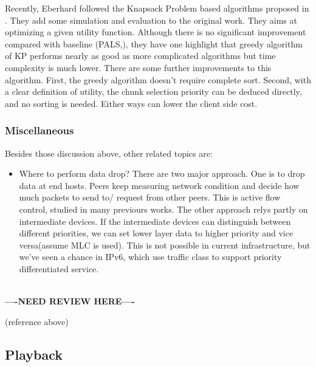 \documentclass[11pt,a4paper]{article}
\newcommand{\question}{\textbf{\\----NEED REVIEW HERE----\\}}
\begin{document}
Recently, Eberhard \cite{eberhard2010knapsack} followed the 
Knapsack Problem based algorithms proposed in \cite{szkaliczki2010piece}. 
They add some simulation and evaluation to the original work. 
They aims at optimizing a given utility function. Although there 
is no significant improvement compared with baseline
(PALS,\cite{rejaie2003pals}), they have one highlight that greedy 
algorithm of KP performs nearly as good as more complicated 
algorithms but time complexity is much lower. There are some further 
improvements to this algorithm. First, the greedy algorithm doesn't 
require complete sort. Second, with a clear definition of utility, 
the chunk selection priority can be deduced directly, and no 
sorting is needed. Either ways can lower the client side cost. 

\subsubsection{Miscellaneous}

Besides those discussion above, other related topics are:
\begin{itemize}
	\item Where to perform data drop? There are two major approach. 
	One is to drop data at end hosts. Peers keep measuring 
	network condition and decide how much packets to send to/ 
	request from other peers. This is active flow control, 
	studied in many previours works. The other approach relys 
	partly on intermediate devices. If the intermediate devices
	can distinguish between different priorities, we can set 
	lower layer data to higher priority and vice versa(assume 
	MLC is used). This is not possible in current infrastructure, 
	but we've seen a chance in IPv6, which use traffic class to 
	support priority differentiated service.  
\end{itemize}

\question

(reference above)

\subsection{Playback}
\end{document}
